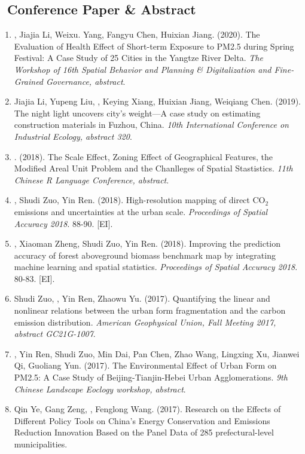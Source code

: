 \subsection*{\texorpdfstring{\faBook\ Conference Paper \& Abstract}{Conference Paper \& Abstract}}
\begin{enumerate}
\item
    \Shaoqing, Jiajia Li, Weixu. Yang, Fangyu Chen, Huixian Jiang. (2020).
    The Evaluation of Health Effect of Short-term Exposure to PM2.5 during Spring Festival: A Case Study of 25 Cities in the Yangtze River Delta.
    \textit{The Workshop of 16th Spatial Behavior and Planning \& Digitalization and Fine-Grained Governance, abstract}.
\item
    Jiajia Li, Yupeng Liu, \Shaoqing, Keying Xiang, Huixian Jiang, Weiqiang Chen. (2019).
    The night light uncovers city’s weight—A case study on estimating construction materials in Fuzhou, China.
    \textit{10th International Conference on Industrial Ecology, abstract 320}.
\item
    \Shaoqing. (2018).
    The Scale Effect, Zoning Effect of Geographical Features, the Modified Areal Unit Problem and the Chanlleges of Spatial Stastistics.
    \textit{11th Chinese R Language Conference, abstract}.
\item
    \Shaoqing, Shudi Zuo, Yin Ren. (2018).
    High-resolution mapping of direct CO$_2$ emissions and uncertainties at the urban scale.
    \textit{Proceedings of Spatial Accuracy 2018}. 88-90. [EI].
\item
    \Shaoqing\CF, Xiaoman Zheng, Shudi Zuo, Yin Ren. (2018).
    Improving the prediction accuracy of forest aboveground biomass benchmark map by integrating machine learning and spatial statistics.
    \textit{Proceedings of Spatial Accuracy 2018}. 80-83. [EI].
\item
    Shudi Zuo, \Shaoqing, Yin Ren, Zhaowu Yu. (2017).
    Quantifying the linear and nonlinear relations between the urban form fragmentation and the carbon emission distribution.
    \textit{American Geophysical Union, Fall Meeting 2017, abstract GC21G-1007}.
\item
    \Shaoqing, Yin Ren, Shudi Zuo, Min Dai, Pan Chen, Zhao Wang, Lingxing Xu, Jianwei Qi, Guoliang Yun. (2017).
    The Environmental Effect of Urban Form on PM2.5: A Case Study of Beijing-Tianjin-Hebei Urban Agglomerations.
    \textit{9th Chinese Landscape Eoclogy workshop, abstract}.
\item
    Qin Ye, Gang Zeng, \Shaoqing, Fenglong Wang. (2017).
    Research on the Effects of Different Policy Tools on China’s Energy Conservation and Emissions Reduction Innovation Based on the Panel Data of 285 prefectural-level municipalities.

\end{enumerate}
